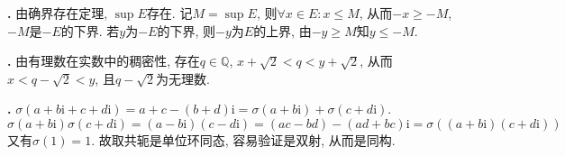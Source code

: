 \par \textbf{\thesolnum .} 由确界存在定理, $\sup E$存在. 记$M=\sup E$, 则$\forall x\in E: x\le M$, 从而$-x \ge -M$, $-M$是$-E$的下界. 若$y$为$-E$的下界, 则$-y$为$E$的上界, 由$-y\ge M$知$y \le -M$. 

\par \textbf{\thesolnum .} 由有理数在实数中的稠密性, 存在$q\in \mathbb{Q}$, $x+\sqrt{2}<q<y+\sqrt{2}$, 从而$x<q-\sqrt{2}<y$, 且$q-\sqrt{2}$为无理数. 

\par \textbf{\thesolnum .} $\sigma(a+b\mathrm{i}+c+d\mathrm{i})=a+c-(b+d)\mathrm{i} = \sigma (a+b\mathrm{i})+\sigma(c+d\mathrm{i})$. 
\begin{equation*}
\sigma(a+b\mathrm{i})\sigma(c+d\mathrm{i}) = (a-b\mathrm{i})(c-d\mathrm{i})=(ac-bd)-(ad+bc)\mathrm{i} = \sigma((a+b\mathrm{i})(c+d\mathrm{i}))
\end{equation*}
又有$\sigma(1)=1$. 故取共轭是单位环同态, 容易验证是双射, 从而是同构. 
